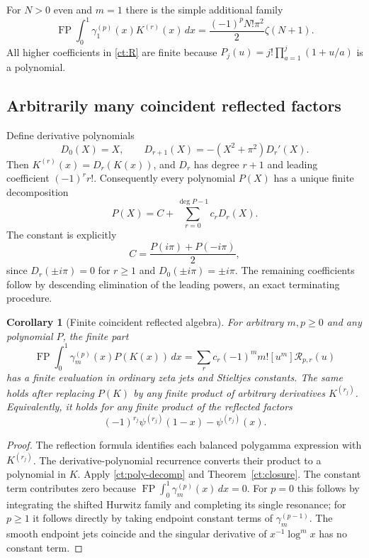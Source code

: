 \documentclass[11pt,a4paper]{article}
\numberwithin{equation}{section}
\newtheorem{corollary}[theorem]{Corollary}
\theoremstyle{definition}
\theoremstyle{remark}
\begin{document}
For $N>0$ even and $m=1$ there is the simple additional family
\[
 \operatorname{FP}\int_0^1\gamma_1^{(p)}(x)K^{(r)}(x)\,dx
   =\frac{(-1)^pN!\pi^2}{2}\zeta(N+1).
\]
All higher coefficients in \eqref{ct:R} are finite because
$P_j(u)=j!\prod_{a=1}^j(1+u/a)$ is a polynomial.

\subsection{Arbitrarily many coincident reflected factors}

Define derivative polynomials
\[
 D_0(X)=X,\qquad D_{r+1}(X)=-(X^2+\pi^2)D_r'(X).
\]
Then $K^{(r)}(x)=D_r(K(x))$, and $D_r$ has degree $r+1$ and leading
coefficient $(-1)^rr!$. Consequently every polynomial $P(X)$ has a unique
finite decomposition
\begin{equation}\label{ct:poly-decomp}
 P(X)=C+\sum_{r=0}^{\deg P-1}c_rD_r(X).
\end{equation}
The constant is explicitly
\[
 C=\frac{P(i\pi)+P(-i\pi)}2,
\]
since $D_r(\pm i\pi)=0$ for $r\ge1$ and $D_0(\pm i\pi)=\pm i\pi$.
The remaining coefficients follow by descending elimination of the
leading powers, an exact terminating procedure.

\begin{corollary}[Finite coincident reflected algebra]
\label{ct:algebra}
For arbitrary $m,p\ge0$ and any polynomial $P$, the finite part
\[
 \operatorname{FP}\int_0^1\gamma_m^{(p)}(x)P(K(x))\,dx
 =\sum_r c_r(-1)^m m![u^m]\mathcal R_{p,r}(u)
\]
has a finite evaluation in ordinary zeta jets and Stieltjes constants.
The same holds after replacing
$P(K)$ by any finite product of arbitrary derivatives $K^{(r_j)}$.
Equivalently, it holds for any finite product of the reflected factors
\[
 (-1)^{r_j}\psi^{(r_j)}(1-x)-\psi^{(r_j)}(x).
\]
\end{corollary}
\begin{proof}
The reflection formula \cite[Eq.~5.15.6]{DLMFPolyGamma} identifies each balanced polygamma expression
with $K^{(r_j)}$. The derivative-polynomial recurrence converts their
product to a polynomial in $K$. Apply \eqref{ct:poly-decomp} and
Theorem~\ref{ct:closure}. The constant term contributes zero because
$\operatorname{FP}\int_0^1\gamma_m^{(p)}(x)\,dx=0$. For $p=0$ this
follows by integrating the shifted Hurwitz family and completing its
single resonance; for $p\ge1$ it follows directly by taking endpoint
constant terms of $\gamma_m^{(p-1)}$. The smooth endpoint jets coincide
and the singular derivative of $x^{-1}\log^m x$ has no constant term.
\end{proof}
\end{document}
